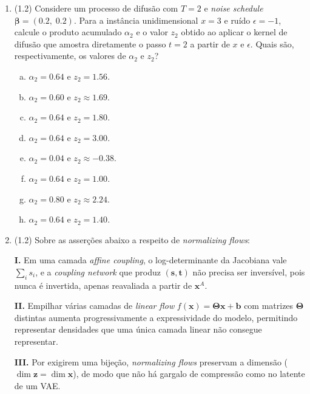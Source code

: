 \documentclass[11pt,a4paper]{article}
\begin{document}
\begin{enumerate}[1)]

\item (1.2) Considere um processo de difusão com $T = 2$ e \textit{noise schedule} $\boldsymbol{\beta} = (0.2,\; 0.2)$. Para a instância unidimensional $x = 3$ e ruído $\epsilon = -1$, calcule o produto acumulado $\alpha_2$ e o valor $z_2$ obtido ao aplicar o kernel de difusão que amostra diretamente o passo $t = 2$ a partir de $x$ e $\epsilon$. Quais são, respectivamente, os valores de $\alpha_2$ e $z_2$?
\begin{enumerate}[a)]
    \item $\alpha_2 = 0.64$ e $z_2 = 1.56$.
    \item $\alpha_2 = 0.60$ e $z_2 \approx 1.69$.
    \item $\alpha_2 = 0.64$ e $z_2 = 1.80$.
    \item $\alpha_2 = 0.64$ e $z_2 = 3.00$.
    \item $\alpha_2 = 0.04$ e $z_2 \approx -0.38$.
    \item $\alpha_2 = 0.64$ e $z_2 = 1.00$.
    \item $\alpha_2 = 0.80$ e $z_2 \approx 2.24$.
    \item $\alpha_2 = 0.64$ e $z_2 = 1.40$.
\end{enumerate}

\item (1.2) Sobre as asserções abaixo a respeito de \textit{normalizing flows}:

\textbf{I.} Em uma camada \textit{affine coupling}, o log-determinante da Jacobiana vale $\sum_i s_i$, e a \textit{coupling network} que produz $(\mathbf{s}, \mathbf{t})$ não precisa ser inversível, pois nunca é invertida, apenas reavaliada a partir de $\mathbf{x}^{A}$.

\textbf{II.} Empilhar várias camadas de \textit{linear flow} $f(\mathbf{x}) = \mathbf{\Theta}\mathbf{x} + \mathbf{b}$ com matrizes $\mathbf{\Theta}$ distintas aumenta progressivamente a expressividade do modelo, permitindo representar densidades que uma única camada linear não consegue representar.

\textbf{III.} Por exigirem uma bijeção, \textit{normalizing flows} preservam a dimensão ($\dim \mathbf{z} = \dim \mathbf{x}$), de modo que não há gargalo de compressão como no latente de um VAE.


\end{enumerate}
\end{document}
